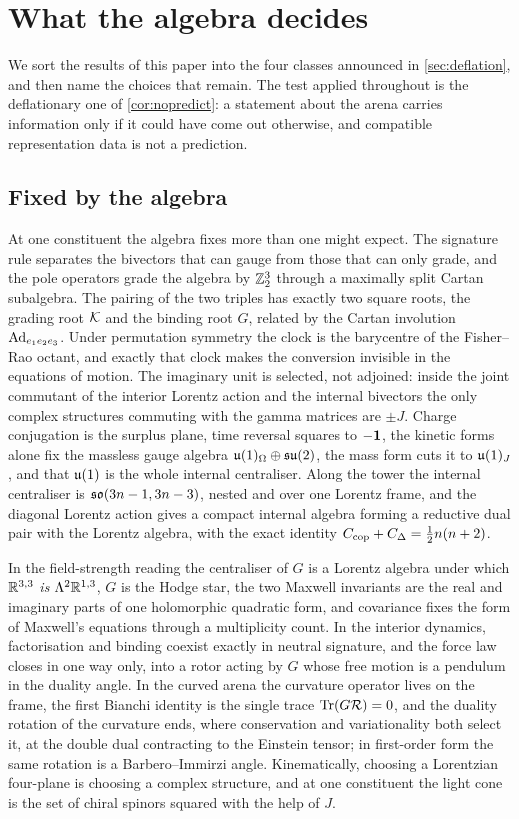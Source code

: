 \section{What the algebra decides}
\label{sec:assessment}

We sort the results of this paper into the four classes announced in \cref{sec:deflation}, and then name the choices that remain. The test applied throughout is the
deflationary one of \cref{cor:nopredict}: a statement about the arena carries information only if it could have come out otherwise, and compatible representation
data is not a prediction.

\subsection{Fixed by the algebra}

At one constituent the algebra fixes more than one might expect. The signature rule separates the bivectors that can gauge from those that can only grade, and the
pole operators grade the algebra by $\mathbb{Z}_2^3$ through a maximally split Cartan subalgebra. The pairing of the two triples has exactly two square roots, the grading root
$\mathcal K$ and the binding root $G$, related by the Cartan involution $\operatorname{Ad}_{e_1e_2e_3}$. Under permutation symmetry the clock is the barycentre of the Fisher--Rao octant, and
exactly that clock makes the conversion invisible in the equations of motion. The imaginary unit is selected, not adjoined: inside the joint commutant of the interior
Lorentz action and the internal bivectors the only complex structures commuting with the gamma matrices are $\pm J$. Charge conjugation is the surplus plane, time reversal
squares to $-\mathbf 1$, the kinetic forms alone fix the massless gauge algebra $\mathfrak{u}(1)_\Omega\oplus\mathfrak{su}(2)$, the mass form cuts it to $\mathfrak{u}(1)_J$, and that $\mathfrak{u}(1)$ is the whole internal
centraliser. Along the tower the internal centraliser is $\mathfrak{so}(3n-1,3n-3)$, nested and over one Lorentz frame, and the diagonal Lorentz action gives a compact internal algebra
forming a reductive dual pair with the Lorentz algebra, with the exact identity $C_{\rm cop}+C_\Delta=\tfrac12n(n+2)$.

In the field-strength reading the centraliser of $G$ is a Lorentz algebra under which $\mathbb{R}^{3,3}$ \emph{is} $\Lambda^2\mathbb{R}^{1,3}$, $G$ is the Hodge star, the two Maxwell
invariants are the real and imaginary parts of one holomorphic quadratic form, and covariance fixes the form of Maxwell's equations through a multiplicity count. In the
interior dynamics, factorisation and binding coexist exactly in neutral signature, and the force law closes in one way only, into a rotor acting by $G$ whose free motion is a
pendulum in the duality angle. In the curved arena the curvature operator lives on the frame, the first Bianchi identity is the single trace $\operatorname{Tr}(G\mathcal R)=0$, and the duality
rotation of the curvature ends, where conservation and variationality both select it, at the double dual contracting to the Einstein tensor; in first-order form the same
rotation is a Barbero--Immirzi angle. Kinematically, choosing a Lorentzian four-plane is choosing a complex structure, and at one constituent the light cone is the set of
chiral spinors squared with the help of $J$.

